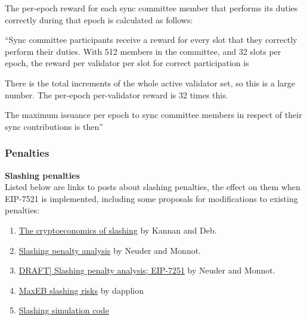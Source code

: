 The per-epoch reward for each sync committee member that performs its duties correctly during that epoch is calculated as follows: 


``Sync committee participants receive a reward for every slot that they correctly perform their duties. With 512 members in the committee, and 32 slots per epoch, the reward per validator per slot for correct participation is


There is the total increments of the whole active validator set, so this is a large number. The per-epoch per-validator reward is 32 times this.

The maximum issuance per epoch to sync committee members in respect of their sync contributions is then''


\subsubsection{Penalties}
\textbf{Slashing penalties} \\
\noindent
Listed below are links to posts about slashing penalties, the effect on them when EIP-7521 is implemented, including some proposals for modifications to existing penalties:
\begin{enumerate}
\item \href{https://a16zcrypto.com/posts/article/the-cryptoeconomics-of-slashing/}{The cryptoeconomics of slashing} by Kannan and Deb.
\item \href{https://ethresear.ch/t/slashing-penalty-analysis-eip-7251/16509}{Slashing penalty analysis} by Neuder and Monnot.
\item \href{https://notes.ethereum.org/@mikeneuder/slashings-eip-7251}{DRAFT] Slashing penalty analysis; EIP-7251} by Neuder and Monnot.
\item \href{https://hackmd.io/@dapplion/maxeb_slashing_risks}{MaxEB slashing risks} by dapplion
\item \href{https://colab.research.google.com/drive/1lBe4qH4oqI8D9cmcQGca3O1AdR3SVr5z?usp=sharing#scrollTo=Hiw1NPEZIQVi}{Slashing simulation code}
\end{enumerate}


